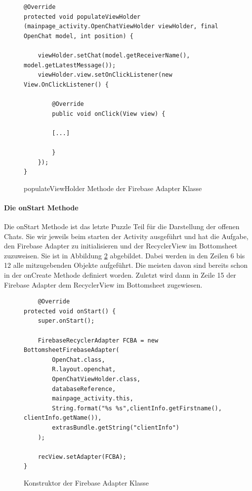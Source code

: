 \documentclass[a4paper,11pt]{report}
\begin{document}
\begin{figure}
	\begin{center}
		\begin{verbatim}
@Override
protected void populateViewHolder (mainpage_activity.OpenChatViewHolder viewHolder, final OpenChat model, int position) {
	
	viewHolder.setChat(model.getReceiverName(), model.getLatestMessage());
	viewHolder.view.setOnClickListener(new View.OnClickListener() {
		
		@Override
		public void onClick(View view) {
		
		[...]
		
		}
	});
}
		\end{verbatim}
		\caption{populateViewHolder Methode der Firebase Adapter Klasse}\label{java:FirebaseAdapterPop}
	\end{center}

\end{figure}

			\paragraph{Die onStart Methode}
			Die onStart Methode ist das letzte Puzzle Teil für die Darstellung der offenen Chats. Sie wir jeweils beim starten der Activity ausgeführt und hat die Aufgabe, den Firebase Adapter zu initialisieren und der RecyclerView im Bottomsheet zuzuweisen. Sie ist in Abbildung \ref{java:onStart} abgebildet. Dabei werden in den Zeilen 6 bis 12 alle mitzugebenden Objekte aufgeführt. Die meisten davon sind bereits schon in der onCreate Methode definiert worden. Zuletzt wird dann in Zeile 15 der Firebase Adapter dem RecyclerView im Bottomsheet zugewiesen.
\begin{figure}
	\begin{center}
		\begin{verbatim}
    @Override
protected void onStart() {
	super.onStart();

	FirebaseRecyclerAdapter FCBA = new BottomsheetFirebaseAdapter(
		OpenChat.class,
		R.layout.openchat,
		OpenChatViewHolder.class,
		databaseReference,
		mainpage_activity.this,
		String.format("%s %s",clientInfo.getFirstname(), clientInfo.getName()),
		extrasBundle.getString("clientInfo")
	);

	recView.setAdapter(FCBA);
}
		\end{verbatim}
		\caption{Konstruktor der Firebase Adapter Klasse}\label{java:onStart}
	\end{center}

\end{figure}			
			
\end{document}
